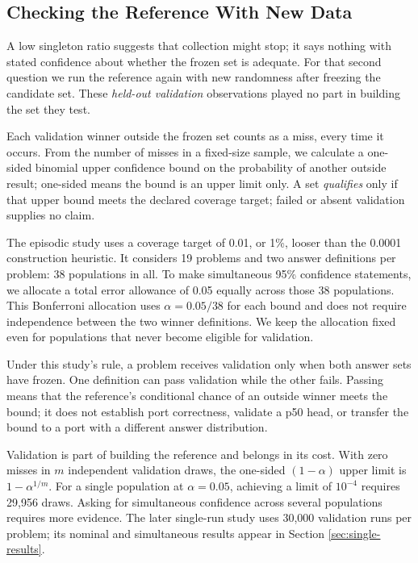 \documentclass[10pt,letterpaper]{article}
\begin{document}
\subsection{Checking the Reference With New Data}\label{sec:qualification}

A low singleton ratio suggests that collection might stop; it says nothing with stated
confidence about whether the frozen set is adequate. For that second question we run the
reference again with new randomness after freezing the candidate set. These \emph{held-out
validation} observations played no part in building the set they test.

Each validation winner outside the frozen set counts as a miss, every time it occurs. From
the number of misses in a fixed-size sample, we calculate a one-sided binomial upper
confidence bound on the probability of another outside result; one-sided means the bound
is an upper limit only. A set \emph{qualifies} only if that upper bound meets the declared
coverage target; failed or absent validation supplies no claim.

The episodic study uses a coverage target of 0.01, or 1\%, looser than the 0.0001
construction heuristic. It considers 19 problems and two answer definitions per problem:
38 populations in all. To make simultaneous 95\% confidence statements, we allocate a
total error allowance of 0.05 equally across those 38 populations. This Bonferroni
allocation uses \(\alpha=0.05/38\) for each bound and does not require independence
between the two winner definitions. We keep the allocation fixed even for populations that
never become eligible for validation.

Under this study's rule, a problem receives validation only when both answer sets have
frozen. One definition can pass validation while the other fails. Passing means that the
reference's conditional chance of an outside winner meets the bound; it does not establish
port correctness, validate a p50 head, or transfer the bound to a port with a different
answer distribution.

Validation is part of building the reference and belongs in its cost. With zero misses in
\(m\) independent validation draws, the one-sided \((1-\alpha)\) upper limit is
\(1-\alpha^{1/m}\). For a single population at \(\alpha=0.05\), achieving a limit of
\(10^{-4}\) requires 29,956 draws. Asking for simultaneous confidence across several
populations requires more evidence. The later single-run study uses 30,000 validation runs
per problem; its nominal and simultaneous results appear in Section
\ref{sec:single-results}.
\end{document}

